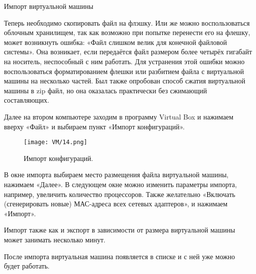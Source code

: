 Импорт виртуальной машины

Теперь необходимо скопировать файл на флэшку. Или же можно воспользоваться облочным хранилищем, так как возможно при попытке перенести его на флешку, может возникнуть ошибка: «Файл слишком велик для конечной файловой системы». Она возникает, если передаётся файл размером более четырёх гигабайт на носитель, неспособный с ним работать. Для устранения этой ошибки можно воспользоваться форматированием флешки или разбитием файла с виртуальной машины на несколько частей. Был также опробован способ сжатия виртуальной машины в zip файл, но она оказалась практически без сжимающий составляющих.

Далее на втором компьютере заходим в программу Virtual Box и нажимаем вверху «Файл» и выбираем пункт «Импорт конфигураций».

\begin{figure}[h]
		\centering
		\texttt{[image: VM/14.png]}
\caption{Импорт конфигураций.}
\label{ris:image}
\end{figure}

В окне импорта выбираем место размещения файла виртуальной машины, нажимаем «Далее». В следующем окне можно изменить параметры импорта, например, увеличить количество процессоров. Также желательно «Включать (сгенерировать новые) МАС-адреса всех сетевых адаптеров», и нажимаем «Импорт».

Импорт также как и экспорт в зависимости от размера виртуальной машины может занимать несколько минут.

После импорта виртуальная машина появляется в списке и с ней уже можно будет работать.